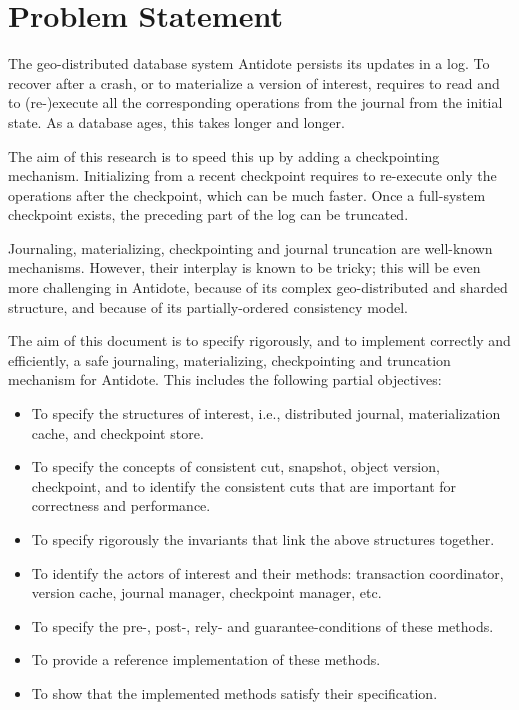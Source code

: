 \documentclass[twoside]{article}
\begin{document}
\makeRR   

\tableofcontents
\newpage

\section{Problem Statement}
\label{sec:problem-statement}
The geo-distributed database system Antidote persists its
updates in a log.
To recover after a crash, or to materialize a version of interest,
requires to read and to (re-)execute all the corresponding operations
from the journal from the initial state.
As a database ages, this takes longer and longer.

The aim of this research is to speed this up by adding a checkpointing
mechanism.
Initializing from a recent checkpoint requires to re-execute only
the operations after the checkpoint, which can be much faster.
Once a full-system checkpoint exists, the preceding part of the log can
be truncated.

Journaling, materializing, checkpointing and journal truncation are
well-known mechanisms.
However, their interplay is known to be tricky; this will be even more
challenging in Antidote, because of its complex geo-distributed and
sharded structure, and because of its partially-ordered consistency
model.

The aim of this document is to specify rigorously, and to implement
correctly and efficiently, a safe journaling, materializing,
checkpointing and truncation mechanism for Antidote.
This includes the following partial objectives:
\begin{itemize}
\item
  To specify the structures of interest, i.e., distributed journal,
  materialization cache, and checkpoint store.
\item
  To specify the concepts of consistent cut, snapshot, object version,
  checkpoint, and to identify the consistent cuts that are important for
  correctness and performance.
\item
  To specify rigorously the invariants that link the above structures
  together.
\item
  To identify the actors of interest and their methods: transaction
  coordinator, version cache, journal manager, checkpoint manager, etc.
\item
  To specify the pre-, post-, rely- and guarantee-conditions of these
  methods.
\item
  To provide a reference implementation of these methods.
\item
  To show that the implemented methods satisfy their specification.
\end{itemize}
\end{document}

